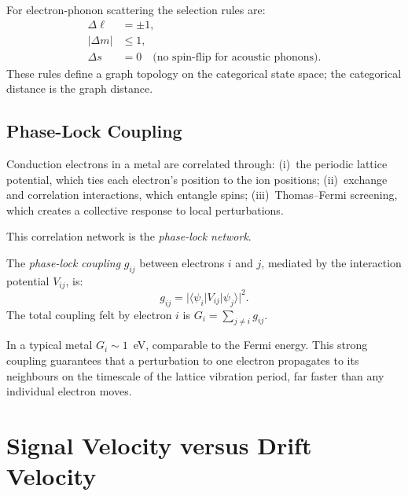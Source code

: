 For electron-phonon scattering the selection rules are:
\begin{align}
  \Delta \ell &= \pm 1, \label{eq:ch18-sel1}\\
  \lvert\Delta m\rvert &\leq 1, \label{eq:ch18-sel2}\\
  \Delta s &= 0 \quad \text{(no spin-flip for acoustic phonons).}
  \label{eq:ch18-sel3}
\end{align}
These rules define a graph topology on the categorical state space; the
categorical distance is the graph distance.

\subsection{Phase-Lock Coupling}

Conduction electrons in a metal are correlated through:
(i)~the periodic lattice potential, which ties each electron's position to
the ion positions;
(ii)~exchange and correlation interactions, which entangle spins;
(iii)~Thomas--Fermi screening, which creates a collective response to local
perturbations.

This correlation network is the \emph{phase-lock network}.

\begin{definition}
\label{def:ch18-phaslock}
The \emph{phase-lock coupling} $g_{ij}$ between electrons $i$ and $j$,
mediated by the interaction potential $V_{ij}$, is:
\begin{equation}
  g_{ij} = \bigl\lvert \langle \psi_i \rvert V_{ij} \lvert \psi_j
    \rangle \bigr\rvert^2.
  \label{eq:ch18-coupling}
\end{equation}
The total coupling felt by electron $i$ is $G_i = \sum_{j \neq i} g_{ij}$.
\end{definition}

In a typical metal $G_i \sim 1$~eV, comparable to the Fermi energy.  This
strong coupling guarantees that a perturbation to one electron propagates
to its neighbours on the timescale of the lattice vibration period, far
faster than any individual electron moves.

\section{Signal Velocity versus Drift Velocity}
\label{sec:ch18-velocity}

